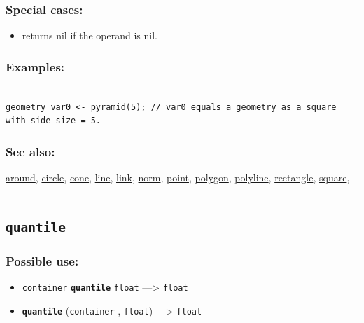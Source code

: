 \documentclass[]{book}
\providecommand{\tightlist}{%
  \setlength{\itemsep}{0pt}\setlength{\parskip}{0pt}}
\theoremstyle{definition}
\theoremstyle{definition}
\theoremstyle{definition}
\theoremstyle{remark}
\begin{document}
\subsubsection{Special cases:}\label{special-cases-115}

\begin{itemize}
\tightlist
\item
  returns nil if the operand is nil.
\end{itemize}

\subsubsection{Examples:}\label{examples-293}

\begin{verbatim}
 
geometry var0 <- pyramid(5); // var0 equals a geometry as a square with side_size = 5.
\end{verbatim}

\subsubsection{See also:}\label{see-also-171}

\href{operators-a-to-a.html\#around}{around},
\href{operators-b-to-c.html\#circle}{circle},
\href{operators-b-to-c.html\#cone}{cone},
\href{operators-i-to-m.html\#line}{line},
\href{operators-i-to-m.html\#link}{link},
\href{operators-n-to-r.html\#norm}{norm},
\href{operators-n-to-r.html\#point}{point},
\href{operators-n-to-r.html\#polygon}{polygon},
\href{operators-n-to-r.html\#polyline}{polyline},
\href{operators-n-to-r.html\#rectangle}{rectangle},
\href{operators-s-to-z.html\#square}{square},

\begin{center}\rule{0.5\linewidth}{\linethickness}\end{center}

\subsection{\texorpdfstring{\texttt{quantile}}{quantile}}\label{quantile}

\subsubsection{Possible use:}\label{possible-use-424}

\begin{itemize}
\tightlist
\item
  \texttt{container} \textbf{\texttt{quantile}} \texttt{float}
  ---\textgreater{} \texttt{float}
\item
  \textbf{\texttt{quantile}} (\texttt{container} , \texttt{float})
  ---\textgreater{} \texttt{float}
\end{itemize}
\end{document}
